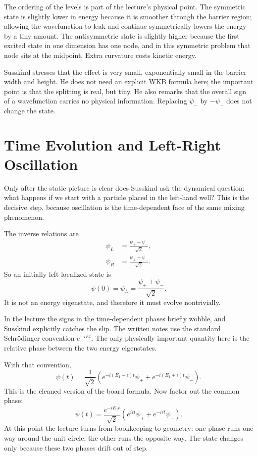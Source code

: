 The ordering of the levels is part of the lecture's physical point. The symmetric state is slightly lower in energy because it is smoother through the barrier region; allowing the wavefunction to leak and continue symmetrically lowers the energy by a tiny amount. The antisymmetric state is slightly higher because the first excited state in one dimension has one node, and in this symmetric problem that node sits at the midpoint. Extra curvature costs kinetic energy.

Susskind stresses that the effect is very small, exponentially small in the barrier width and height. He does not need an explicit WKB formula here; the important point is that the splitting is real, but tiny. He also remarks that the overall sign of a wavefunction carries no physical information. Replacing \(\psi_-\) by \(-\psi_-\) does not change the state.

\section{Time Evolution and Left-Right Oscillation}

Only after the static picture is clear does Susskind ask the dynamical question: what happens if we start with a particle placed in the left-hand well? This is the decisive step, because oscillation is the time-dependent face of the same mixing phenomenon.

The inverse relations are
\begin{align}
\psi_L &= \frac{\psi_+ + \psi_-}{\sqrt{2}},\\
\psi_R &= \frac{\psi_+ - \psi_-}{\sqrt{2}}.
\end{align}
So an initially left-localized state is
\begin{equation}
\psi(0)=\psi_L=\frac{\psi_+ + \psi_-}{\sqrt{2}}.
\end{equation}
It is not an energy eigenstate, and therefore it must evolve nontrivially.

\begin{remark}
In the lecture the signs in the time-dependent phases briefly wobble, and Susskind explicitly catches the slip. The written notes use the standard Schr\"odinger convention \(e^{-iEt}\). The only physically important quantity here is the relative phase between the two energy eigenstates.
\end{remark}

With that convention,
\begin{equation}
\psi(t)=\frac{1}{\sqrt{2}}\left(e^{-i(E_1-\epsilon)t}\psi_+ + e^{-i(E_1+\epsilon)t}\psi_-\right).
\end{equation}
This is the cleaned version of the board formula. Now factor out the common phase:
\begin{equation}
\psi(t)=\frac{e^{-iE_1 t}}{\sqrt{2}}\left(e^{i\epsilon t}\psi_+ + e^{-i\epsilon t}\psi_-\right).
\end{equation}
At this point the lecture turns from bookkeeping to geometry: one phase runs one way around the unit circle, the other runs the opposite way. The state changes only because these two phases drift out of step.

